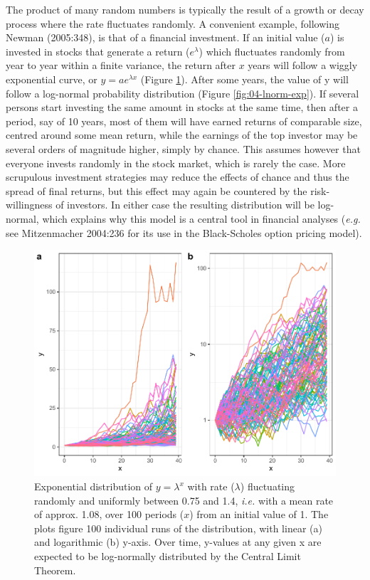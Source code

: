 \documentclass[
  12pt,
]{book}
\begin{document}
The product of many random numbers is typically the result of a growth or decay process where the rate fluctuates randomly. A convenient example, following Newman (2005:348), is that of a financial investment. If an initial value (\(a\)) is invested in stocks that generate a return (\(e^\lambda\)) which fluctuates randomly from year to year within a finite variance, the return after \(x\) years will follow a wiggly exponential curve, or \(y = a e^{\lambda x}\) (Figure \ref{fig:04-multi-exp}). After some years, the value of y will follow a log-normal probability distribution (Figure \ref{fig:04-lnorm-exp}). If several persons start investing the same amount in stocks at the same time, then after a period, say of 10 years, most of them will have earned returns of comparable size, centred around some mean return, while the earnings of the top investor may be several orders of magnitude higher, simply by chance. This assumes however that everyone invests randomly in the stock market, which is rarely the case. More scrupulous investment strategies may reduce the effects of chance and thus the spread of final returns, but this effect may again be countered by the risk-willingness of investors. In either case the resulting distribution will be log-normal, which explains why this model is a central tool in financial analyses (\emph{e.g.} see Mitzenmacher 2004:236 for its use in the Black-Scholes option pricing model).



\begin{figure}

{\centering \includegraphics[width=0.7\linewidth]{bookdown-demo_files/figure-latex/04-multi-exp-1} 

}

\caption{Exponential distribution of \(y = \lambda ^x\) with rate (\(\lambda\)) fluctuating randomly and uniformly between 0.75 and 1.4, \emph{i.e.} with a mean rate of approx. 1.08, over 100 periods (\(x\)) from an initial value of 1. The plots figure 100 individual runs of the distribution, with linear (a) and logarithmic (b) y-axis. Over time, y-values at any given x are expected to be log-normally distributed by the Central Limit Theorem.}\label{fig:04-multi-exp}
\end{figure}
\end{document}
